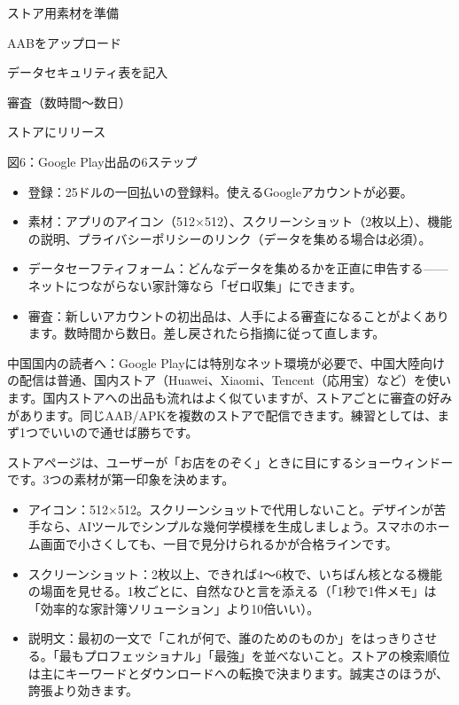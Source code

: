 ストア用素材を準備

AABをアップロード

データセキュリティ表を記入

審査（数時間〜数日）

ストアにリリース

\begin{center}\small\color{gray}図6：Google Play出品の6ステップ\end{center}

\begin{itemize}
  \item 登録：25ドルの一回払いの登録料。使えるGoogleアカウントが必要。
  \item 素材：アプリのアイコン（512×512）、スクリーンショット（2枚以上）、機能の説明、プライバシーポリシーのリンク（データを集める場合は必須）。
  \item データセーフティフォーム：どんなデータを集めるかを正直に申告する——ネットにつながらない家計簿なら「ゼロ収集」にできます。
  \item 審査：新しいアカウントの初出品は、人手による審査になることがよくあります。数時間から数日。差し戻されたら指摘に従って直します。
\end{itemize}

中国国内の読者へ：Google Playには特別なネット環境が必要で、中国大陸向けの配信は普通、国内ストア（Huawei、Xiaomi、Tencent（応用宝）など）を使います。国内ストアへの出品も流れはよく似ていますが、ストアごとに審査の好みがあります。同じAAB/APKを複数のストアで配信できます。練習としては、まず1つでいいので通せば勝ちです。


ストアページは、ユーザーが「お店をのぞく」ときに目にするショーウィンドーです。3つの素材が第一印象を決めます。

\begin{itemize}
  \item アイコン：512×512。スクリーンショットで代用しないこと。デザインが苦手なら、AIツールでシンプルな幾何学模様を生成しましょう。スマホのホーム画面で小さくしても、一目で見分けられるかが合格ラインです。
  \item スクリーンショット：2枚以上、できれば4〜6枚で、いちばん核となる機能の場面を見せる。1枚ごとに、自然なひと言を添える（「1秒で1件メモ」は「効率的な家計簿ソリューション」より10倍いい）。
  \item 説明文：最初の一文で「これが何で、誰のためのものか」をはっきりさせる。「最もプロフェッショナル」「最強」を並べないこと。ストアの検索順位は主にキーワードとダウンロードへの転換で決まります。誠実さのほうが、誇張より効きます。
\end{itemize}

